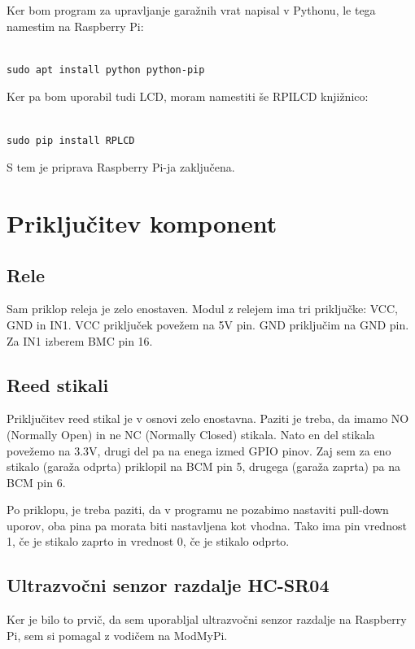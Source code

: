 \documentclass[11pt]{article}
\begin{document}
Ker bom program za upravljanje garažnih vrat napisal v Pythonu, le tega namestim na Raspberry Pi:
\begin{verbatim}
  
sudo apt install python python-pip
\end{verbatim}

Ker pa bom uporabil tudi LCD, moram namestiti še RPILCD knjižnico:

\begin{verbatim}
  
sudo pip install RPLCD
\end{verbatim}

S tem je priprava Raspberry Pi-ja zaključena.

\section{Priključitev komponent}
\subsection{Rele}
Sam priklop releja je zelo enostaven. Modul z relejem ima tri priključke: VCC, GND in IN1. VCC priključek povežem na 5V pin. GND priključim na GND pin. Za IN1 izberem BMC pin 16.

\subsection{Reed stikali}
Priključitev reed stikal je v osnovi zelo enostavna. Paziti je treba, da imamo NO (Normally Open) in ne NC (Normally Closed) stikala. Nato en del stikala povežemo na 3.3V, drugi del pa na enega izmed GPIO pinov. Zaj sem za eno stikalo (garaža odprta) priklopil na BCM pin 5, drugega (garaža zaprta) pa na BCM pin 6.

Po priklopu, je treba paziti, da v programu ne pozabimo nastaviti pull-down uporov, oba pina pa morata biti nastavljena kot vhodna. Tako ima pin vrednost 1, če je stikalo zaprto in vrednost 0, če je stikalo odprto.

\subsection{Ultrazvočni senzor razdalje HC-SR04}
Ker je bilo to prvič, da sem uporabljal ultrazvočni senzor razdalje na Raspberry Pi, sem si pomagal z vodičem na ModMyPi\cite{ModMyPi_us}.
\end{document}
